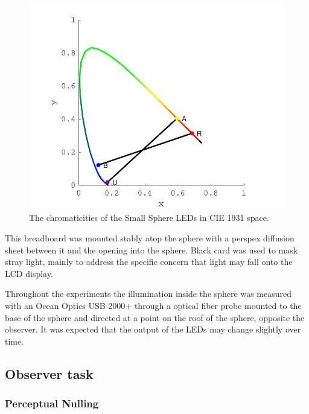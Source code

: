 \begin{figure}[htbp]
\includegraphics[max width=\textwidth,center]{figs/SmallSphere/LED_cross.pdf}
\caption{The chromaticities of the Small Sphere \glspl{LED} in CIE 1931 space.}
\label{fig:LED_cross}
\end{figure}

This breadboard was mounted stably atop the sphere with a perspex diffusion sheet between it and the opening into the sphere. Black card was used to mask stray light, mainly to address the specific concern that light may fall onto the LCD display.


Throughout the experiments the illumination inside the sphere was measured with an Ocean Optics USB 2000+ through a optical fiber probe mounted to the base of the sphere and directed at a point on the roof of the sphere, opposite the observer. It was expected that the output of the \glspl{LED} may change slightly over time. %


\subsection{Observer task}

\subsubsection{Perceptual Nulling}

